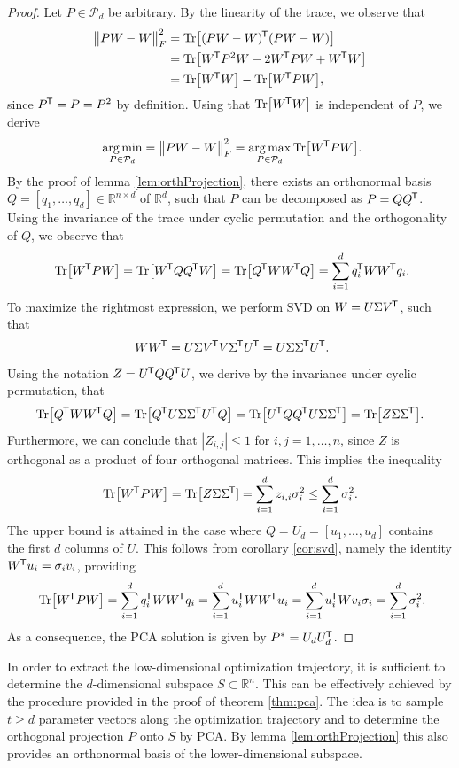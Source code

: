 \documentclass[11pt, a4paper]{article}
\newcommand{\R}{\mathbb{R}}
\renewcommand{\P}{\mathcal{P}}
\newcommand*{\tr}{^{\mkern-1.5mu\mathsf{T}}}
\DeclareMathOperator*{\argmin}{arg\,min}
\DeclareMathOperator*{\argmax}{arg\,max}
\begin{document}
\begin{proof}
Let $P \in \P_d$ be arbitrary. By the linearity of the trace, we observe that
\[ \begin{split}
\big \| PW - W \big \|_F^2 
&= \text{Tr} \big [ (PW-W)\tr (PW-W) \big ] \\\
&= \text{Tr} \big [ W\tr  P^2 W - 2 W\tr PW + W\tr W \big ] \\\
&= \text{Tr} \big [ W\tr W\big ] - \text{Tr} \big [W\tr PW \big ],
\end{split} \]
since $P\tr =P=P^2$ by definition. Using that $\text{Tr} \big [ W\tr W\big ]$ is independent of $P$, we derive
\[ \argmin_{P \in \P_d} = \big \| PW-W \big \|_F^2 = \argmax_{P \in \P_d} \text{Tr} \big [ W\tr PW\big ]. \]
By the proof of lemma \ref{lem:orthProjection}, there exists an orthonormal basis $Q = [q_1, \dots, q_d] \in \R^{n \times d}$ of $\R^d$, such that $P$ can be decomposed as $P=QQ\tr $. Using the invariance of the trace under cyclic permutation and the orthogonality of $Q$, we observe that
\[ \text{Tr} \big [ W\tr PW \big ] = \text{Tr} \big [ W\tr QQ\tr W \big ] = \text{Tr} \big [ Q\tr WW\tr Q \big ] = \sum_{i=1}^{d} q_i\tr WW\tr q_i. \]
To maximize the rightmost expression, we perform SVD on $W = U \Sigma V\tr $, such that
\[ WW\tr  = U \Sigma V\tr  V \Sigma\tr  U\tr  = U \Sigma \Sigma\tr  U\tr . \]
Using the notation $Z = U\tr QQ\tr U$, we derive by the invariance under cyclic permutation, that
\[ \text{Tr} \big [ Q\tr WW\tr Q \big ] = \text{Tr} \big [ Q\tr U \Sigma \Sigma\tr  U\tr Q \big ] = \text{Tr} \big [ U\tr QQ\tr U\Sigma \Sigma\tr  \big ] = \text{Tr} \big [ Z \Sigma \Sigma\tr  \big ]. \]
Furthermore, we can conclude that $|Z_{i,j} | \leq 1$ for $i,j=1,\dots,n$, since $Z$ is orthogonal as a product of four orthogonal matrices. This implies the inequality
\[ \text{Tr} \big [ W\tr PW \big ] = \text{Tr} \big [ Z \Sigma \Sigma\tr  ] = \sum_{i=1}^{d} z_{i,i} \sigma_i^2 \leq \sum_{i=1}^{d} \sigma_i^2. \]
The upper bound is attained in the case where $Q = U_d = [u_1, \dots, u_d]$ contains the first $d$ columns of $U$. This follows from corollary \ref{cor:svd}, namely the identity $W\tr u_i = \sigma_iv_i$, providing
\[ \text{Tr} \big [ W\tr PW \big ] = \sum_{i=1}^{d} q_i\tr WW\tr q_i = \sum_{i=1}^{d} u_i\tr WW\tr u_i = \sum_{i=1}^{d} u_i\tr W v_i \sigma_i = \sum_{i=1}^{d} \sigma_i^2. \]
As a consequence, the PCA solution is given by $P^* = U_dU_d\tr$.
\end{proof}

In order to extract the low-dimensional optimization trajectory, it is sufficient to determine the $d$-dimensional subspace $S \subset \R^n$. This can be effectively achieved by the procedure provided in the proof of theorem \ref{thm:pca}. The idea is to sample $t \geq d$ parameter vectors along the optimization trajectory and to determine the orthogonal projection $P$ onto $S$ by PCA. By lemma \ref{lem:orthProjection} this also provides an orthonormal basis of the lower-dimensional subspace. \\
\end{document}
